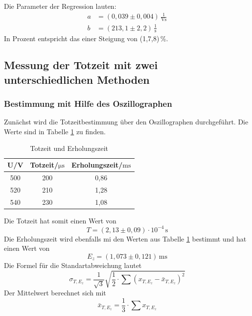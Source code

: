 Die Parameter der Regression lauten:
\begin{align*}
  a &= (0,039\pm 0,004)\,\mathrm{\frac{1}{Vs}}\\
  b &= (213,1 \pm 2,2)\, \mathrm{\frac{1}{s}}
\end{align*}
In Prozent entspricht das einer Steigung von (1,7,8)\,\%. %


\subsection{Messung der Totzeit mit zwei unterschiedlichen Methoden}
\subsubsection{Bestimmung mit Hilfe des Oszillographen}

Zunächst wird die Totzeitbestimmung über den Oszillographen durchgeführt.
Die Werte sind in Tabelle \ref{tab:tez} zu finden.
\begin{table}
\centering
\caption{Totzeit und Erholungszeit}
\label{tab:tez}
\begin{tabular}{c c c}
\toprule
{U/V} & {Totzeit/$\mathrm{\mu s}$} & {Erholungszeit/$\mathrm{ms}$}\\
\midrule
500 & 200 & 0,86 \\
520 & 210 & 1,28 \\
540 & 230 & 1,08 \\
\bottomrule
\end{tabular}
\end{table}

Die Totzeit hat somit einen Wert von
\begin{equation*}
  T = (2,13\pm0,09)\cdot 10^{-4}\,\mathrm{s}
\end{equation*}
Die Erholungszeit wird ebenfalls mi den Werten aus Tabelle \ref{tab:tez} bestimmt und hat einen Wert von
\begin{equation*}
  E_z = (1,073 \pm 0,121)\,\mathrm{ms}
\end{equation*}
Die Formel für die Standartabweichung lautet
\begin{equation*}
 \sigma_{T, E_z} =   \frac{1}{\sqrt{3}}\sqrt{\frac{1}{2}\cdot\sum\left(x_{T, E_z}-\bar{x}_{T, E_z}\right)^2}
\end{equation*}
Der Mittelwert berechnet sich mit
\begin{equation*}
  \bar{x}_{T, E_z} = \frac{1}{3}\cdot \sum x_{T, E_z}
\end{equation*}


